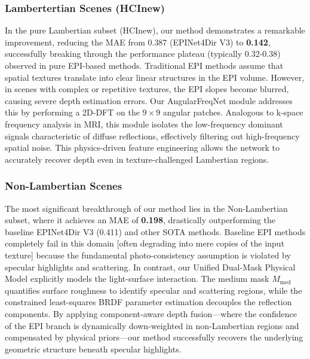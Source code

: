 \documentclass[lettersize,journal]{IEEEtran}
\begin{document}
\subsubsection{Lambertertian Scenes (HCInew)}
In the pure Lambertian subset (HCInew), our method demonstrates a remarkable improvement, reducing the MAE from 0.387 (EPINet4Dir V3) to \textbf{0.142}, successfully breaking through the performance plateau (typically 0.32-0.38) observed in pure EPI-based methods. Traditional EPI methods assume that spatial textures translate into clear linear structures in the EPI volume. However, in scenes with complex or repetitive textures, the EPI slopes become blurred, causing severe depth estimation errors. Our AngularFreqNet module addresses this by performing a 2D-DFT on the $9 \times 9$ angular patches. Analogous to k-space frequency analysis in MRI, this module isolates the low-frequency dominant signals characteristic of diffuse reflections, effectively filtering out high-frequency spatial noise. This physics-driven feature engineering allows the network to accurately recover depth even in texture-challenged Lambertian regions.

\subsubsection{Non-Lambertian Scenes}
The most significant breakthrough of our method lies in the Non-Lambertian subset, where it achieves an MAE of \textbf{0.198}, drastically outperforming the baseline EPINet4Dir V3 (0.411) and other SOTA methods. Baseline EPI methods completely fail in this domain  [often degrading into mere copies of the input texture] because the fundamental photo-consistency assumption is violated by specular highlights and scattering. In contrast, our Unified Dual-Mask Physical Model explicitly models the light-surface interaction. The medium mask $M_{\text{med}}$ quantifies surface roughness to identify specular and scattering regions, while the constrained least-squares BRDF parameter estimation decouples the reflection components. By applying component-aware depth fusion—where the confidence of the EPI branch is dynamically down-weighted in non-Lambertian regions and compensated by physical priors—our method successfully recovers the underlying geometric structure beneath specular highlights.
\end{document}
